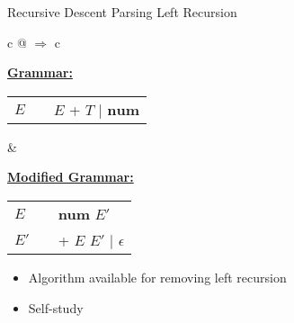 \documentclass{beamer}
\begin{document}
\begin{frame}{Recursive Descent Parsing}
{Left Recursion}

\begin{tabular}{c @{\hspace{0.5cm} $\Rightarrow$ \hspace{0.5cm}} c}
\begin{minipage}{0.45\textwidth}
\textbf{\color{purple}\underline{Grammar:}}
\begin{framed}
\begin{tabular}{l @{} c @{} l}
$E$        & {\myprod}   & $E$ + $T$ $|$ $\textbf{num}$
\end{tabular}
\end{framed}
\pause
\end{minipage}
&
\begin{minipage}{0.4\textwidth}
\textbf{\color{purple}\underline{Modified Grammar:}}

\begin{framed}
\begin{tabular}{l @{} c @{} l}
$E$        & {\myprod}   & \textbf{num} $E'$                      \\
$E'$       & {\myprod}   & + $E$ $E'$ $|$ $\epsilon$
\end{tabular}
\end{framed}
\end{minipage}
\end{tabular}

\pause
\begin{itemize}
\item Algorithm available for removing left recursion
\item Self-study
\end{itemize}
\end{frame}
\end{document}
